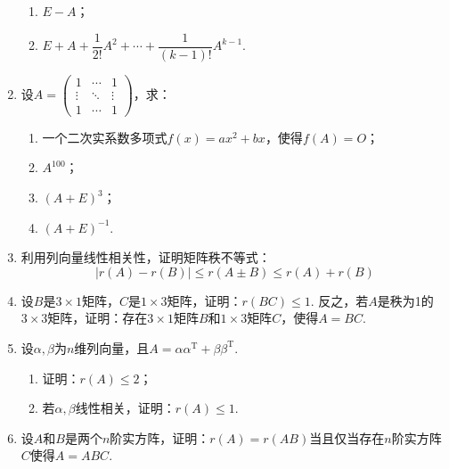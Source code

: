 \begin{enumerate}
\begin{enumerate}
              \item $E-A$；

              \item $E+A+\dfrac{1}{2!}A^2+\cdots+\dfrac{1}{(k-1)!}A^{k-1}$.
          \end{enumerate}

    \item 设$A=\begin{pmatrix}
                  1      & \cdots & 1      \\
                  \vdots & \ddots & \vdots \\
                  1      & \cdots & 1
              \end{pmatrix}$，求：
          \begin{enumerate}
              \item 一个二次实系数多项式$f(x)=ax^2+bx$，使得$f(A)=O$；
              \item $A^100$；
              \item $(A+E)^3$；
              \item $(A+E)^{-1}$.
          \end{enumerate}

    \item 利用列向量线性相关性，证明矩阵秩不等式：\[|r(A)-r(B)|\leqslant r(A\pm B) \leqslant r(A)+r(B)\]

    \item 设$B$是$3 \times 1$矩阵，$C$是$1 \times 3$矩阵，证明：$r(BC) \leqslant 1$. 反之，若$A$是秩为1的$3 \times 3$矩阵，证明：存在$3 \times 1$矩阵$B$和$1 \times 3$矩阵$C$，使得$A = BC$.

    \item 设$\alpha,\beta$为$n$维列向量，且$A=\alpha\alpha^\mathrm{T}+\beta\beta^\mathrm{T}$.
        \begin{enumerate}
            \item 证明：$r(A) \leqslant 2$；

            \item 若$\alpha,\beta$线性相关，证明：$r(A) \leqslant 1$.
        \end{enumerate}

    \item 设$A$和$B$是两个$n$阶实方阵，证明：$r(A)=r(AB)$当且仅当存在$n$阶实方阵$C$使得$A=ABC$. %
\end{enumerate}

